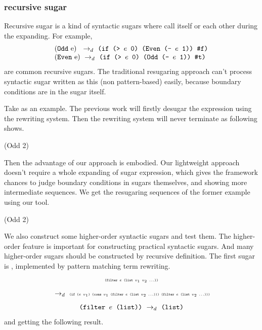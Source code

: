\subsubsection{recursive sugar}
\label{sec:recursiveSugar}

Recursive sugar is a kind of syntactic sugars where call itself or each other during the expanding. For example,
\[
\begin{array}{l}
\drule{(\m{Odd}~$e$)~}{\Code{(if (> $e$ 0) (Even (- $e$ 1)) \false)}}\\
\drule{(\m{Even}~$e$)}{\Code{(if (> $e$ 0) (Odd (- $e$ 1)) \true)}}
\end{array}
\]
are common recursive sugars. The traditional resugaring approach can't process syntactic sugar written as this (non pattern-based) easily, because boundary conditions are in the sugar itself.

Take  as an example. The previous work will firstly desugar the expression using the rewriting system. Then the rewriting system will never terminate as following shows.
\begin{Codes}
   (Odd 2)
\end{Codes}


Then the advantage of our approach is embodied. Our lightweight approach doesn't require a whole expanding of sugar expression, which gives the framework chances to judge boundary conditions in sugars themselves, and showing more intermediate sequences. We get the resugaring sequences of the former example using our tool.
\begin{Codes}
    (Odd 2)
\end{Codes}


We also construct some higher-order syntactic sugars and test them. The higher-order feature is important for constructing practical syntactic sugars. And many higher-order sugars should be constructed by recursive definition. The first sugar is , implemented by pattern matching term rewriting.
\[\texttt{\tiny (filter $e$ (list $v_1$ $v_2$ ...))}\]
\[
\drule{}
{\Code{\tiny (if ($e$ $v_1$) (cons $v_1$ (filter $e$ (list $v_2$ ...)))\ (filter $e$ (list $v_2$ ...)))}}
\]
\[
\texttt{(filter $e$ (list))} ~\rightarrow_d~ \texttt{(list)}
\]
and getting the following result.

